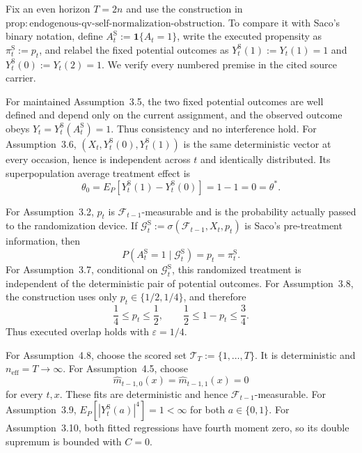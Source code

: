 Fix an even horizon \(T=2n\) and use the construction in \(\mathrm{prop:endogenous\text{-}qv\text{-}self\text{-}normalization\text{-}obstruction}\). To compare it with Saco's binary notation, define \(A_t^{\mathrm S}:=\mathbf 1\{A_t=1\}\), write the executed propensity as \(\pi_t^{\mathrm S}:=p_t\), and relabel the fixed potential outcomes as \(Y_t^{\mathrm S}(1):=Y_t(1)=1\) and \(Y_t^{\mathrm S}(0):=Y_t(2)=1\). We verify every numbered premise in the cited source carrier.

For maintained Assumption~3.5, the two fixed potential outcomes are well defined and depend only on the current assignment, and the observed outcome obeys \(Y_t=Y_t^{\mathrm S}(A_t^{\mathrm S})=1\). Thus consistency and no interference hold. For Assumption~3.6, \((X_t,Y_t^{\mathrm S}(0),Y_t^{\mathrm S}(1))\) is the same deterministic vector at every occasion, hence is independent across \(t\) and identically distributed. Its superpopulation average treatment effect is
\[
 \theta_0=E_P[Y_t^{\mathrm S}(1)-Y_t^{\mathrm S}(0)]=1-1=0=\theta^*.
\tag{32}
\]

For Assumption~3.2, \(p_t\) is \(\mathcal F_{t-1}\)-measurable and is the probability actually passed to the randomization device. If \(\mathcal G_t^{\mathrm S}:=\sigma(\mathcal F_{t-1},X_t,p_t)\) is Saco's pre-treatment information, then
\[
 P(A_t^{\mathrm S}=1\mid\mathcal G_t^{\mathrm S})=p_t=\pi_t^{\mathrm S}.
\tag{33}
\]
For Assumption~3.7, conditional on \(\mathcal G_t^{\mathrm S}\), this randomized treatment is independent of the deterministic pair of potential outcomes. For Assumption~3.8, the construction uses only \(p_t\in\{1/2,1/4\}\), and therefore
\[
 \frac14\le p_t\le\frac12,
 \qquad
 \frac12\le1-p_t\le\frac34.
\tag{34}
\]
Thus executed overlap holds with \(\varepsilon=1/4\).

For Assumption~4.8, choose the scored set \(\mathcal T_T:=\{1,\ldots,T\}\). It is deterministic and \(n_{\mathrm{eff}}=T\to\infty\). For Assumption~4.5, choose
\[
 \widehat m_{t-1,0}(x)=\widehat m_{t-1,1}(x)=0
\tag{35}
\]
for every \(t,x\). These fits are deterministic and hence \(\mathcal F_{t-1}\)-measurable. For Assumption~3.9, \(E_P[|Y_t^{\mathrm S}(a)|^4]=1<\infty\) for both \(a\in\{0,1\}\). For Assumption~3.10, both fitted regressions have fourth moment zero, so its double supremum is bounded with \(C=0\).

